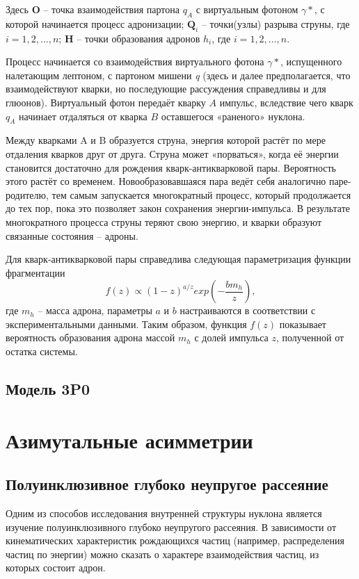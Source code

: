 \documentclass{extarticle}
\begin{document}
Здесь \textbf{O} – точка взаимодействия партона $q_A$ с виртуальным фотоном $\gamma*$, с которой начинается процесс адронизации; $\textbf{Q}_i$ – точки(узлы) разрыва струны, где $i = 1, 2, \dots, n$; \textbf{H} -- точки образования адронов $h_i$, где $i = 1, 2, \dots, n$.

Процесс начинается со взаимодействия виртуального фотона $\gamma*$, испущенного налетающим лептоном, с партоном мишени \textit{q} (здесь и далее предполагается, что взаимодействуют кварки, но последующие рассуждения справедливы и для глюонов). Виртуальный фотон передаёт кварку $A$ импульс, вследствие чего кварк $q_A$ начинает отдаляться от кварка $B$ оставшегося «раненого» нуклона. 

Между кварками A и B образуется струна, энергия которой растёт по мере отдаления кварков друг от друга. Струна может «порваться», когда её энергии становится достаточно для рождения кварк-антикварковой пары. Вероятность этого растёт со временем. Новообразовавшаяся пара ведёт себя аналогично паре-родителю, тем самым запускается многократный процесс, который продолжается до тех пор, пока это позволяет закон сохранения энергии-импульса. В результате многократного процесса струны теряют свою энергию, и кварки образуют связанные состояния – адроны. 

Для кварк-антикварковой пары справедлива следующая параметризация функции фрагментации
\begin{equation}
	f(z) \propto (1-z)^{a/z} exp(- \frac{b m_h}{z}),
\end{equation}
где $m_h$ – масса адрона, параметры $a$ и $b$ настраиваются в соответствии с экспериментальными данными. Таким образом, функция $f(z)$ показывает вероятность образования адрона массой $m_h$ с долей импульса $z$, полученной от остатка системы.
\subsection{Модель 3P0}
\newpage
\section{Азимутальные асимметрии}
\subsection{Полуинклюзивное глубоко неупругое рассеяние}
Одним из способов исследования внутренней структуры нуклона является изучение полуинклюзивного глубоко неупругого рассеяния. В зависимости от кинематических характеристик рождающихся частиц (например, распределения частиц по энергии) можно сказать о характере взаимодействия частиц, из которых состоит адрон. 
\end{document}
